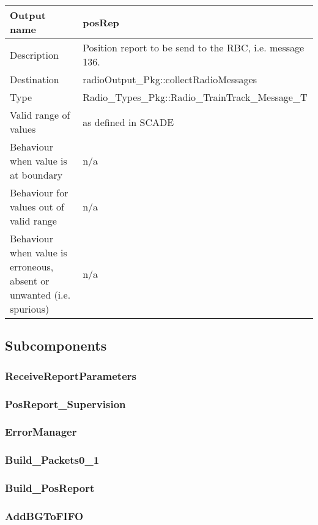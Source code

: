 \begin{longtable}{p{}p{}}
\toprule
Output name				& posRep \\
\midrule
Description				& Position report to be send to the RBC, i.e. message 136. \\
\midrule
Destination				& radioOutput\_Pkg::collectRadioMessages \\ 
\midrule
Type					& Radio\_Types\_Pkg::Radio\_TrainTrack\_Message\_T \\
\midrule
Valid range of values	& as defined in SCADE \\
\midrule
Behaviour when value is at boundary	& n/a \\
\midrule
Behaviour for values out of valid range	& n/a \\
\midrule
Behaviour when value is erroneous, absent or unwanted (i.e. spurious) & n/a \\
\bottomrule
\end{longtable}


\subsection{Subcomponents}\label{s:provide_position_report_subcomponents}


\subsubsection{ReceiveReportParameters}


\subsubsection{PosReport\_Supervision}


\subsubsection{ErrorManager}


\subsubsection{Build\_Packets0\_1}


\subsubsection{Build\_PosReport}


\subsubsection{AddBGToFIFO}


